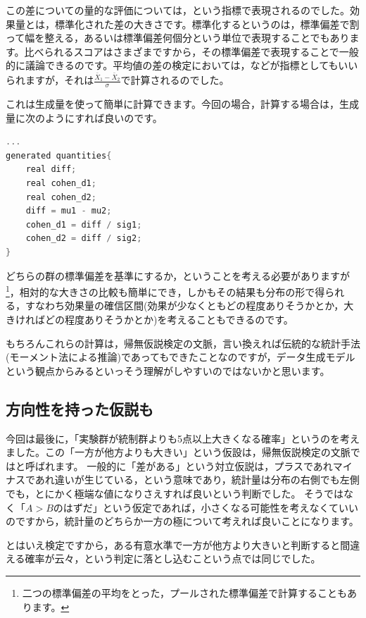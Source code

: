 \documentclass{ltjsbook}
\begin{document}
この差についての量的な評価については，という指標で表現されるのでした。効果量とは，標準化された差の大きさです。標準化するというのは，標準偏差で割って幅を整える，あるいは標準偏差何個分という単位で表現することでもあります。比べられるスコアはさまざまですから，その標準偏差で表現することで一般的に議論できるのです。平均値の差の検定においては，などが指標としてもいいられますが，それは$\frac{\bar{X}_1-\bar{X}_2}{\sigma}$で計算されるのでした。

これは生成量を使って簡単に計算できます。今回の場合，計算する場合は，生成量に次のようにすれば良いのです。
\begin{lstlisting}[language=C++,label={code::19_05},caption={生成量ブロックで効果量の算出}]
    ...
generated quantities{
    real diff;
    real cohen_d1;
    real cohen_d2;
    diff = mu1 - mu2;
    cohen_d1 = diff / sig1;
    cohen_d2 = diff / sig2;
}

\end{lstlisting}

どちらの群の標準偏差を基準にするか，ということを考える必要がありますが\footnote{二つの標準偏差の平均をとった，プールされた標準偏差で計算することもあります。}，相対的な大きさの比較も簡単にでき，しかもその結果も分布の形で得られる，すなわち効果量の確信区間(効果が少なくともどの程度ありそうかとか，大きければどの程度ありそうかとか)を考えることもできるのです。

もちろんこれらの計算は，帰無仮説検定の文脈，言い換えれば伝統的な統計手法(モーメント法による推論)であってもできたことなのですが，データ生成モデルという観点からみるといっそう理解がしやすいのではないかと思います。
\subsection{方向性を持った仮説も}
今回は最後に，「実験群が統制群よりも5点以上大きくなる確率」というのを考えました。この「一方が他方よりも大きい」という仮設は，帰無仮説検定の文脈ではと呼ばれます。
一般的に「差がある」という対立仮説は，プラスであれマイナスであれ違いが生じている，という意味であり，統計量は分布の右側でも左側でも，とにかく極端な値になりさえすれば良いという判断でした。
そうではなく「$A>B$のはずだ」という仮定であれば，小さくなる可能性を考えなくていいのですから，統計量のどちらか一方の極について考えれば良いことになります。

とはいえ検定ですから，ある有意水準で一方が他方より大きいと判断すると間違える確率が云々，という判定に落とし込むこという点では同じでした。
\end{document}
